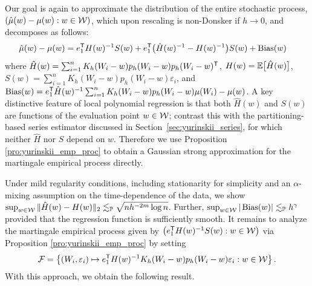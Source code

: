 Our goal is again to approximate the distribution of the entire stochastic
process, $(\hat{\mu}(w)-\mu(w):w\in\mathcal{W})$, which upon rescaling is non-Donsker
if $h \to 0$, and decomposes as follows:
%
\begin{align*}
  \hat{\mu}(w)-\mu(w)
  &= e_1^{\mathsf{T}} H(w)^{-1} S(w)
  + e_1^{\mathsf{T}} \big(\hat H(w)^{-1} - H(w)^{-1}\big) S(w)
  + \operatorname{Bias}(w)
\end{align*}
%
where
$\hat H(w) = \sum_{i=1}^n K_h(W_i-w) p_h(W_i-w) p_h(W_i-w)^{\mathsf{T}}$,
$H(w) = \mathbb{E} \big[ \hat H(w) \big]$,
$S(w)= \sum_{i=1}^n K_h(W_i-w) p_h(W_i-w) \varepsilon_i$,
and
$\operatorname{Bias}(w) = e_1^{\mathsf{T}} \hat H(w)^{-1}
\sum_{i=1}^n K_h(W_i-w) p_h(W_i-w) \mu(W_i) - \mu(w)$.
A key distinctive feature of local polynomial regression is that both
$\hat H(w)$ and $S(w)$ are functions of the evaluation point $w\in\mathcal{W}$;
contrast this with the partitioning-based series estimator discussed in
Section~\ref{sec:yurinskii_series}, for which neither $\hat H$ nor $S$ depend
on $w$.
Therefore we use Proposition \ref{pro:yurinskii_emp_proc} to obtain a Gaussian
strong
approximation for the martingale empirical process directly.

Under mild regularity conditions, including stationarity for simplicity
and an $\alpha$-mixing assumption on the time-dependence of the data, we show
$\sup_{w\in\mathcal{W}} \|\hat H(w)-H(w)\|_2
\lesssim_{\mathbb{P}} \sqrt{n h^{-2m}\log n}$.
Further,
$\sup_{w\in\mathcal{W}} |\operatorname{Bias}(w)|
\lesssim_{\mathbb{P}} h^\gamma$
provided that the regression function is sufficiently smooth.
It remains to analyze the martingale empirical process given by
$\big(e_1^{\mathsf{T}} H(w)^{-1} S(w) : w\in\mathcal{W}\big)$
via Proposition \ref{pro:yurinskii_emp_proc} by setting
%
\begin{align*}
  \mathcal{F} = \left\{
    (W_i, \varepsilon_i) \mapsto
    e_1^{\mathsf{T}} H(w)^{-1}
    K_h(W_i-w) p_h(W_i-w) \varepsilon_i
    : w \in \mathcal{W}
  \right\}.
\end{align*}
%
With this approach, we obtain the following result.

